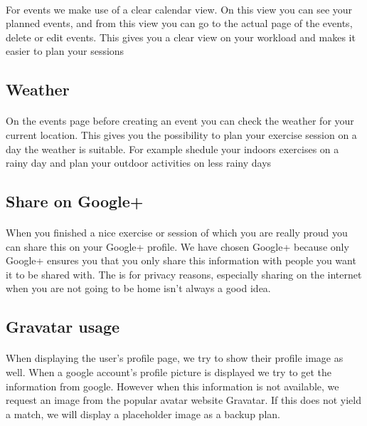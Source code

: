 \documentclass[11pt,a4paper]{scrartcl}
\begin{document}
\paragraph{}For events we make use of a clear calendar view. On this view you can see your planned events, and from this view you can go to the actual page of the events, delete or edit events. This gives you a clear view on your workload and makes it easier to plan your sessions

\subsection{Weather}
\paragraph{}On the events page before creating an event you can check the weather for your current location. This gives you the possibility to plan your exercise session on a day the weather is suitable. For example shedule your indoors exercises on a rainy day and plan your outdoor activities on less rainy days
\subsection{Share on Google+}
\paragraph{}When you finished a nice exercise or session of which you are really proud you can share this on your Google+ profile. We have chosen Google+ because only Google+ ensures you that you only share this information with people you want it to be shared with. The is for privacy reasons, especially sharing on the internet when you are not going to be home isn't always a good idea.

\subsection{Gravatar usage}
\paragraph{}When displaying the user's profile page, we try to show their profile image as well. When a google account's profile picture is displayed we try to get the information from google. However when this information is not available, we request an image from the popular avatar website Gravatar. If this does not yield a match, we will display a placeholder image as a backup plan.
\end{document}
